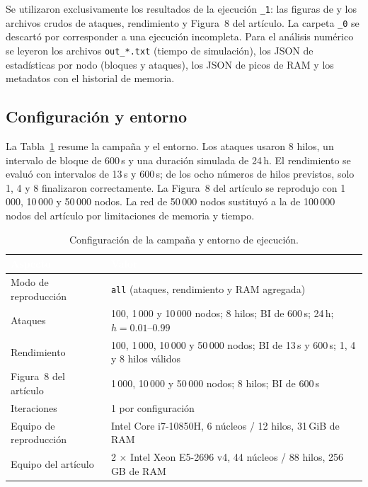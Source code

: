 \documentclass[11pt,a4paper,oneside]{article}
\begin{document}
Se utilizaron exclusivamente los resultados de la ejecución \texttt{\_1}: las figuras de  y los archivos crudos de ataques, rendimiento y Figura~8 del artículo. La carpeta \texttt{\_0} se descartó por corresponder a una ejecución incompleta. Para el análisis numérico se leyeron los archivos \texttt{out\_*.txt} (tiempo de simulación), los JSON de estadísticas por nodo (bloques y ataques), los JSON de picos de RAM y los metadatos con el historial de memoria.

\subsection{Configuración y entorno}

La Tabla~\ref{tab:config} resume la campaña y el entorno. Los ataques usaron 8 hilos, un intervalo de bloque de 600\,s y una duración simulada de 24\,h. El rendimiento se evaluó con intervalos de 13\,s y 600\,s; de los ocho números de hilos previstos, solo 1, 4 y 8 finalizaron correctamente. La Figura~8 del artículo se reprodujo con 1\,000, 10\,000 y 50\,000 nodos. La red de 50\,000 nodos sustituyó a la de 100\,000 nodos del artículo por limitaciones de memoria y tiempo.

\begin{table}[htbp]
\caption{Configuración de la campaña y entorno de ejecución.}
\label{tab:config}
\centering
\small
\renewcommand{\arraystretch}{1.12}
\begin{tabularx}{\textwidth}{>{\raggedright\arraybackslash}p{}X}
\toprule
\rowcolor{tablehead}
\textcolor{white}{\textbf{Aspecto}} &
\textcolor{white}{\textbf{Valor}} \\
\midrule
Modo de reproducción & \texttt{all} (ataques, rendimiento y RAM agregada) \\
Ataques & 100, 1\,000 y 10\,000 nodos; 8 hilos; BI de 600\,s; 24\,h; $h=0.01$--$0.99$ \\
Rendimiento & 100, 1\,000, 10\,000 y 50\,000 nodos; BI de 13\,s y 600\,s; 1, 4 y 8 hilos válidos \\
Figura~8 del artículo & 1\,000, 10\,000 y 50\,000 nodos; 8 hilos; BI de 600\,s \\
Iteraciones & 1 por configuración \\
Equipo de reproducción & Intel Core i7-10850H, 6 núcleos / 12 hilos, 31\,GiB de RAM \\
Equipo del artículo & 2 $\times$ Intel Xeon E5-2696 v4, 44 núcleos / 88 hilos, 256\,GB de RAM \\
\bottomrule
\end{tabularx}
\end{table}
\end{document}
